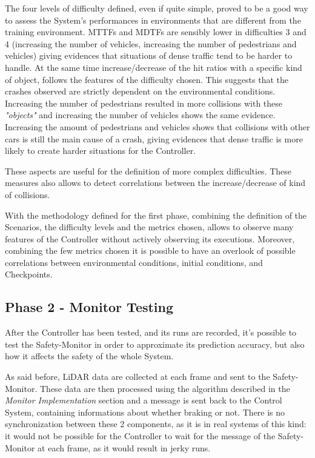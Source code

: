 The four levels of difficulty defined, even if quite simple, proved to be a good way to assess the System's performances in environments that are different from the training environment. MTTFs and MDTFs are sensibly lower in difficulties 3 and 4 (increasing the number of vehicles, increasing the number of pedestrians and vehicles) giving evidences that situations of dense traffic tend to be harder to handle. At the same time increase/decrease of the hit ratios with a specific kind of object, follows the features of the difficulty chosen. This suggests that the crashes observed are strictly dependent on the environmental conditions. Increasing the number of pedestrians resulted in more collisions with these \textsl{"objects"} and increasing the number of vehicles shows the same evidence. Increasing the amount of pedestrians and vehicles shows that collisions with other cars is still the main cause of a crash, giving evidences that dense traffic is more likely to create harder situations for the Controller.

These aspects are useful for the definition of more complex difficulties. These measures also allows to detect correlations between the increase/decrease of kind of collisions.\newline

With the methodology defined for the first phase, combining the definition of the Scenarios, the difficulty levels and the metrics chosen, allows to observe many features of the Controller without actively observing its executions. Moreover, combining the few metrics chosen it is possible to have an overlook of possible correlations between environmental conditions, initial conditions, and Checkpoints.

\subsection{Phase 2 - Monitor Testing}

After the Controller has been tested, and its runs are recorded, it's possible to test the Safety-Monitor in order to approximate its prediction accuracy, but also how it affects the safety of the whole System.

As said before, LiDAR data are collected at each frame and sent to the Safety-Monitor. These data are then processed using the algorithm described in the \textsl{Monitor Implementation} section and a message is sent back to the Control System, containing informations about whether braking or not. There is no synchronization between these 2 components, as it is in real systems of this kind: it would not be possible for the Controller to wait for the message of the Safety-Monitor at each frame, as it would result in jerky runs.

